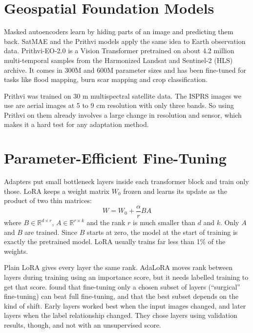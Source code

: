 \documentclass[11pt,a4paper]{report}
\begin{document}
\section{Geospatial Foundation Models}

Masked autoencoders \cite{he2022masked} learn by hiding parts of an image and predicting them back. SatMAE \cite{cong2022satmae} and the Prithvi models \cite{jakubik2023foundation} apply the same idea to Earth observation data. Prithvi-EO-2.0 \cite{szwarcman2024prithvi} is a Vision Transformer pretrained on about 4.2 million multi-temporal samples from the Harmonized Landsat and Sentinel-2 (HLS) archive. It comes in 300M and 600M parameter sizes and has been fine-tuned for tasks like flood mapping, burn scar mapping and crop classification.

Prithvi was trained on 30 m multispectral satellite data. The ISPRS images we use are aerial images at 5 to 9 cm resolution with only three bands. So using Prithvi on them already involves a large change in resolution and sensor, which makes it a hard test for any adaptation method.

\section{Parameter-Efficient Fine-Tuning}

Adapters \cite{houlsby2019parameter} put small bottleneck layers inside each transformer block and train only those. LoRA \cite{hu2022lora} keeps a weight matrix $W_0$ frozen and learns its update as the product of two thin matrices:
\begin{equation}
    W = W_0 + \frac{\alpha}{r} B A
\end{equation}
where $B \in \mathbb{R}^{d \times r}$, $A \in \mathbb{R}^{r \times k}$ and the rank $r$ is much smaller than $d$ and $k$. Only $A$ and $B$ are trained. Since $B$ starts at zero, the model at the start of training is exactly the pretrained model. LoRA usually trains far less than 1\% of the weights.

Plain LoRA gives every layer the same rank. AdaLoRA \cite{zhang2023adalora} moves rank between layers during training using an importance score, but it needs labelled training to get that score. \citet{lee2023surgical} found that fine-tuning only a chosen subset of layers (``surgical'' fine-tuning) can beat full fine-tuning, and that the best subset depends on the kind of shift. Early layers worked best when the input images changed, and later layers when the label relationship changed. They chose layers using validation results, though, and not with an unsupervised score.
\end{document}
